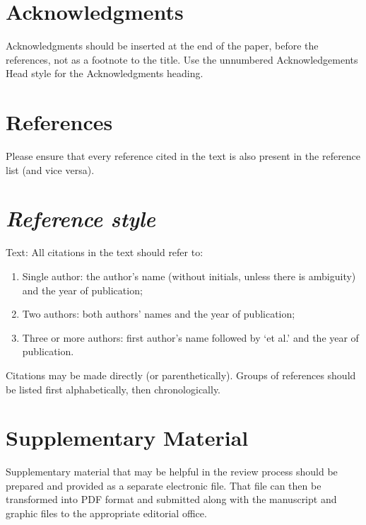 \documentclass[times,onecolumn,final,longtitle]{elsarticle}
\begin{document}
\section*{Acknowledgments}
Acknowledgments should be inserted at the end of the paper, before the
references, not as a footnote to the title. Use the unnumbered
Acknowledgements Head style for the Acknowledgments heading.

\section*{References}

Please ensure that every reference cited in the text is also present in
the reference list (and vice versa).

\section*{\itshape Reference style}

Text: All citations in the text should refer to:
\begin{enumerate}
  \item Single author: the author's name (without initials, unless there
        is ambiguity) and the year of publication;
  \item Two authors: both authors' names and the year of publication;
  \item Three or more authors: first author's name followed by `et al.'
        and the year of publication.
\end{enumerate}
Citations may be made directly (or parenthetically). Groups of
references should be listed first alphabetically, then chronologically.



\section*{Supplementary Material}

Supplementary material that may be helpful in the review process should
be prepared and provided as a separate electronic file. That file can
then be transformed into PDF format and submitted along with the
manuscript and graphic files to the appropriate editorial office.
\end{document}
